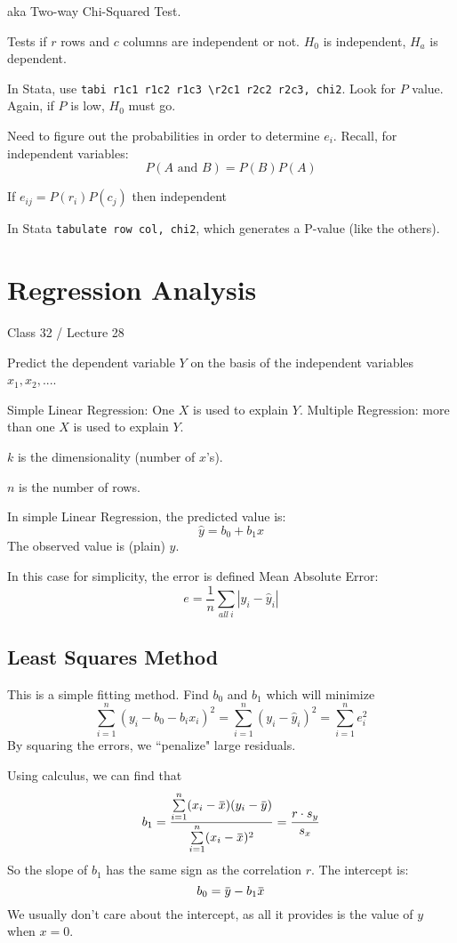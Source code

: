 \documentclass[11pt, oneside]{article}   	%
\newcommand{\overbar}[1]{\mkern 1.5mu\overline{\mkern-1.5mu#1\mkern-1.5mu}\mkern 1.5mu}
\begin{document}
aka Two-way Chi-Squared Test.

Tests if $r$ rows and $c$ columns are independent or not. $H_0$ is independent, $H_a$ is dependent.

In Stata, use \texttt{tabi r1c1 r1c2 r1c3 \textbackslash r2c1 r2c2 r2c3, chi2}. Look for $P$ value. Again, if $P$ is low, $H_0$ must go.

Need to figure out the probabilities in order to determine $e_i$. Recall, for independent variables:
\[
P(A \text{ and } B) = P(B)P(A)
\]

If $e_{ij} = P(r_i) P(c_j)$ then independent

In Stata \texttt{tabulate row col, chi2}, which generates a P-value (like the others).

\section{Regression Analysis}

Class 32 / Lecture 28

Predict the dependent variable $Y$ on the basis of the independent variables $x_1, x_2, ... $.

Simple Linear Regression: One $X$ is used to explain $Y$. Multiple Regression: more than one $X$ is used to explain $Y$.

$k$ is the dimensionality (number of $x$'s).

$n$ is the number of rows.

In simple Linear Regression, the predicted value is:
\[
\hat{y} = b_0 + b_1x
\]
The observed value is (plain) $y$.

In this case for simplicity, the error is defined Mean Absolute Error:
\[
e = \frac{1}{n} \sum\limits_{all\  i} |y_i - \hat{y}_i|
\]

\subsection{Least Squares Method}

This is a simple fitting method. Find $b_0$ and $b_1$ which will minimize
\[
\sum\limits_{i=1}^n (y_i - b_0 - b_ix_i)^2 = \sum\limits_{i=1}^{n} (y_i - \hat{y}_i)^2 = \sum\limits_{i=1}^n e_i^2
\]
By squaring the errors, we ``penalize" large residuals.

Using calculus, we can find that 
\[
b_1 = \frac{ \sum\limits_{i=1}^n (x_i - \overbar{x}) (y_i - \overbar{y}) } { \sum\limits_{i=1}^n (x_i - \overbar{x})^2}  = \frac{r\cdot s_y} { s_x}
\]
So the slope of $b_1$ has the same sign as the correlation $r$. The intercept is:
\[
b_0 = \overbar{y} - b_1\overbar{x}
\]
We usually don't care about the intercept, as all it provides is the value of $y$ when $x = 0$.
\end{document}

